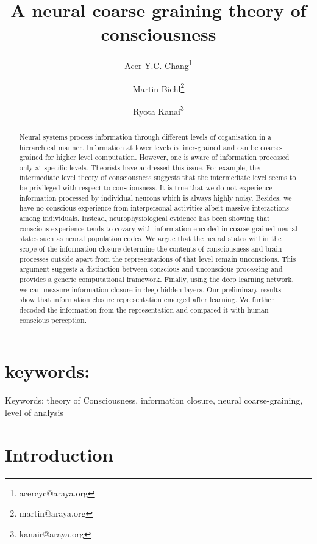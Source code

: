 \documentclass[utf8]{article}
\title{A neural coarse graining theory of consciousness}
\author[1]{Acer Y.C. Chang\thanks{acercyc@araya.org}}
\author[1]{Martin Biehl\thanks{martin@araya.org}}
\author[1]{Ryota Kanai\thanks{kanair@araya.org }}
\affil[1]{ARAYA, Inc., Tokyo, Japan}
\newcommand{\needref}[1]{%
			\ifthenelse{\equal{#1}{}}{%
				\todo[color=White, linecolor=BlueViolet]{\textcolor{BlueViolet}{Ref}}}{%
				\todo[color=White, linecolor=BlueViolet]{\textcolor{BlueViolet}{Ref: #1}}%
				}%
		}
\begin{document}
	\maketitle
	\tableofcontents
	
	\begin{abstract}
		Neural systems process information through different levels of organisation in a hierarchical manner. Information at lower levels is finer-grained and can be coarse-grained for higher level computation. However, one is aware of information processed only at specific levels. Theorists have addressed this issue. For example, the intermediate level theory of consciousness suggests that the intermediate level seems to be privileged with respect to consciousness. It is true that we do not experience information processed by individual neurons which is always highly noisy. Besides, we have no conscious experience from interpersonal activities albeit massive interactions among individuals. Instead, neurophysiological evidence has been showing that conscious experience tends to covary with information encoded in coarse-grained neural states such as neural population codes. We argue that the neural states within the scope of the information closure determine the contents of consciousness and brain processes outside apart from the representations of that level remain unconscious. This argument suggests a distinction between conscious and unconscious processing and provides a generic computational framework. Finally, using the deep learning network, we can measure information closure in deep hidden layers. Our preliminary results show that information closure representation emerged after learning. We further decoded the information from the representation and compared it with human conscious perception. \needref{}
	\end{abstract}
	
	
	\section*{keywords:}
	Keywords: theory of Consciousness, information closure, neural coarse-graining, level of analysis
	
	
	\section{Introduction}
	
\end{document}
